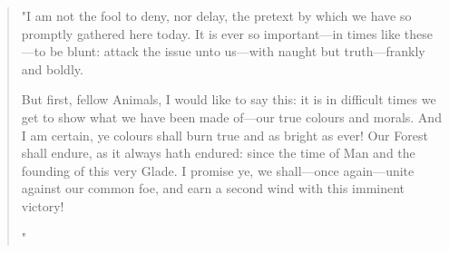 \begin{localsize}{10}
	\begin{quote}
		"I am not the fool to deny, nor delay, the pretext by which we have so promptly gathered here today. It is ever so important---in times like these---to be blunt: attack the issue unto us---with naught but truth---frankly and boldly. 
		
		
		But first, fellow Animals, I would like to say this: it is in difficult times we get to show what we have been made of---our true colours and morals. And I am certain, ye colours shall burn true and as bright as ever! Our Forest shall endure, as it always hath endured: since the time of Man and the founding of this very Glade. I promise ye, we shall---once again---unite against our common foe, and earn a second wind with this imminent victory!
		
		"
	\end{quote} 
\end{localsize}